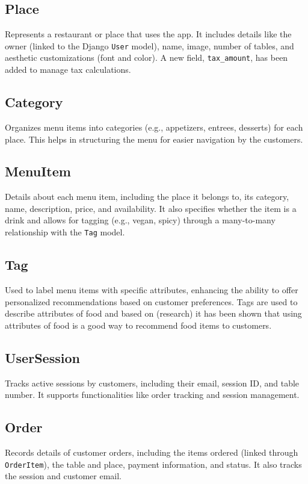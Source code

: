 \subsection{Place}
Represents a restaurant or place that uses the app. It includes details like the owner (linked to the Django \texttt{User} model), name, image, number of tables, and aesthetic customizations (font and color). A new field, \texttt{tax\_amount}, has been added to manage tax calculations.

\subsection{Category}
Organizes menu items into categories (e.g., appetizers, entrees, desserts) for each place. This helps in structuring the menu for easier navigation by the customers.

\subsection{MenuItem}
Details about each menu item, including the place it belongs to, its category, name, description, price, and availability. It also specifies whether the item is a drink and allows for tagging (e.g., vegan, spicy) through a many-to-many relationship with the \texttt{Tag} model.

\subsection{Tag}
Used to label menu items with specific attributes, enhancing the ability to offer personalized recommendations based on customer preferences. Tags are used to describe attributes of food and based on (research) it has been shown that using attributes of food is a good way to recommend food items to customers.

\subsection{UserSession}
Tracks active sessions by customers, including their email, session ID, and table number. It supports functionalities like order tracking and session management. 

\subsection{Order}
Records details of customer orders, including the items ordered (linked through \texttt{OrderItem}), the table and place, payment information, and status. It also tracks the session and customer email.

